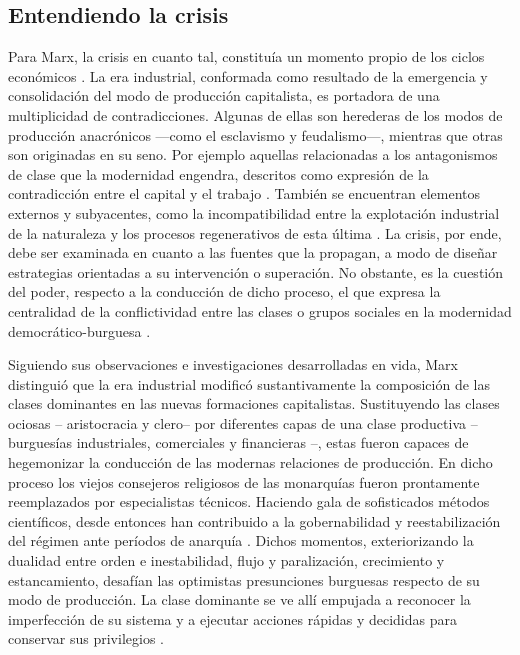 \documentclass{textolivre}
\begin{document}
\subsection{Entendiendo la crisis}\label{sec-crisis}
Para Marx, la crisis en cuanto tal, constituía un momento propio de los ciclos
económicos \cite[p. 11--12]{marx2010}. La era industrial, conformada como resultado de la
emergencia y consolidación del modo de producción capitalista, es portadora de una
multiplicidad de contradicciones. Algunas de ellas son herederas de los modos de
producción anacrónicos —como el esclavismo y feudalismo—, mientras que otras son
originadas en su seno. Por ejemplo aquellas relacionadas a los antagonismos de clase
que la modernidad engendra, descritos como expresión de la contradicción entre el capital
y el trabajo \cite{wallerstein}. También se encuentran elementos
externos y subyacentes, como la incompatibilidad entre la explotación industrial de la
naturaleza y los procesos regenerativos de esta última \cite{Foster2016}. La crisis, por
ende, debe ser examinada en cuanto a las fuentes que la propagan, a modo de diseñar
estrategias orientadas a su intervención o superación. No obstante, es la cuestión del
poder, respecto a la conducción de dicho proceso, el que expresa la centralidad de la
conflictividad entre las clases o grupos sociales en la modernidad democrático-burguesa
\cite{lenin1997}.

Siguiendo sus observaciones e investigaciones desarrolladas en vida, Marx
distinguió que la era industrial modificó sustantivamente la composición de las clases
dominantes en las nuevas formaciones capitalistas. Sustituyendo las clases ociosas --
aristocracia y clero-- por diferentes capas de una clase productiva --burguesías
industriales, comerciales y financieras \cite{marx2003}--, estas fueron capaces de
hegemonizar la conducción de las modernas relaciones de producción. En dicho proceso
los viejos consejeros religiosos de las monarquías fueron prontamente reemplazados por
especialistas técnicos. Haciendo gala de sofisticados métodos científicos, desde entonces
han contribuido a la gobernabilidad y reestabilización del régimen ante períodos de
anarquía \cite{Gunderson2019}. Dichos momentos, exteriorizando la
dualidad entre orden e inestabilidad, flujo y paralización, crecimiento y estancamiento,
desafían las optimistas presunciones burguesas respecto de su modo de producción. La
clase dominante se ve allí empujada a reconocer la imperfección de su sistema y a
ejecutar acciones rápidas y decididas para conservar sus privilegios \cite{lenin1997}.
\end{document}

